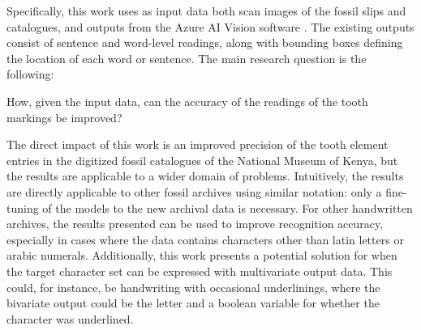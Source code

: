 \documentclass{article}
\begin{document}

Specifically, this work uses as input data both scan images of the fossil slips and catalogues, and outputs from the Azure AI Vision software \cite{azurevision}. The existing outputs consist of sentence and word-level readings, along with bounding boxes defining 
the location of each word or sentence. The main research question is the following: 

How, given the input data, can the accuracy of the readings of the tooth markings be improved?






The direct impact of this work is an improved precision of the tooth element entries in the digitized 
fossil catalogues of the National Museum of Kenya, but the results are applicable to a wider domain of problems.
Intuitively, the results are directly applicable to other fossil archives using similar notation: only a fine-tuning of the 
models to the new archival data is necessary.
For other handwritten archives, the results presented can be used to improve recognition accuracy, especially in cases 
where the data contains characters other than latin letters or arabic numerals. Additionally, this work presents
a potential solution for when the target character set can be expressed with multivariate output data. This could, for 
instance, be handwriting with occasional underlinings, where the bivariate output could be the letter and a boolean variable for 
whether the character was underlined.
\end{document}
